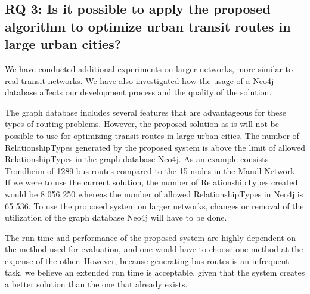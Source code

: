 \subsection*{RQ 3: Is it possible to apply the proposed algorithm to optimize urban transit routes in large urban cities?}

We have conducted additional experiments on larger networks, more similar to real transit networks. We have also investigated how the usage of a Neo4j database affects our development process and the quality of the solution. 

The graph database includes several features that are advantageous for these types of routing problems. However, the proposed solution as-is will not be possible to use for optimizing transit routes in large urban cities. The number of RelationshipTypes generated by the proposed system is above the limit of allowed RelationshipTypes in the graph database Neo4j. As an example consists Trondheim of 1289 bus routes compared to the 15 nodes in the Mandl Network. If we were to use the current solution, the number of RelationshipTypes created would be 8 056 250 whereas the number of allowed RelationshipTypes in Neo4j is 65 536. To use the proposed system on larger networks, changes or removal of the utilization of the graph database Neo4j will have to be done. 

The run time and performance of the proposed system are highly dependent on the method used for evaluation, and one would have to choose one method at the expense of the other. However, because generating bus routes is an infrequent task, we believe an extended run time is acceptable, given that the system creates a better solution than the one that already exists.  
